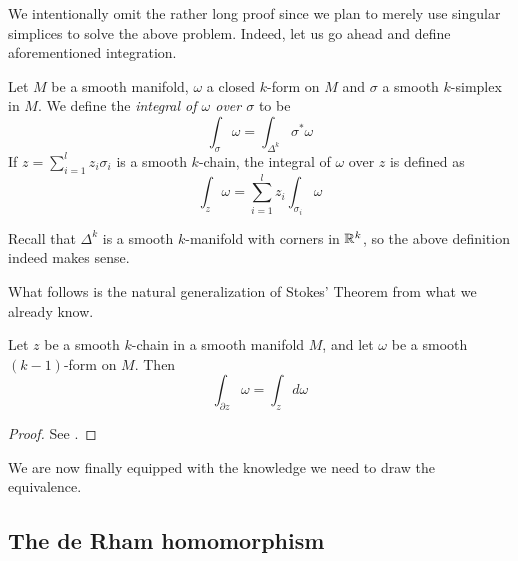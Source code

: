 \documentclass[a4paper, 12pt]{article}
\begin{document}
We intentionally omit the rather long proof since we plan to merely use singular simplices to solve the above problem.
Indeed, let us go ahead and define aforementioned integration.
\begin{definition}
    Let $M$ be a smooth manifold, $\omega$ a closed $k$-form on $M$ and $\sigma$ a smooth $k$-simplex in $M$.
    We define the \emph{integral of $\omega$ over $\sigma$} to be
    \[
        \int_{\sigma} \omega = \int_{\Delta^k} \sigma^*\omega
    \]
    If $z = \sum_{i = 1}^{l}z_i \sigma_i$ is a smooth $k$-chain, the integral of $\omega$ over $z$ is defined as
    \[
        \int_{z} \omega = \sum_{i = 1}^{l} z_i\int_{\sigma_i} \omega
    \]
\end{definition}
\begin{remark}
    Recall that $\Delta^k$ is a smooth $k$-manifold with corners in $\mathbb{R}^k$,
    so the above definition indeed makes sense.
\end{remark}
What follows is the natural generalization of Stokes' Theorem from what we already know.
\begin{theorem}
    Let $z$ be a smooth $k$-chain in a smooth manifold $M$, and let $\omega$ be a smooth $(k-1)$-form on $M$.
    Then
    \[
        \int_{\partial z} \omega = \int_{z} d\omega
    \]
\end{theorem}
\begin{proof}
    See \cite[Thm. 18.12]{Lee2012}.
\end{proof}

We are now finally equipped with the knowledge we need to draw the equivalence.

\subsection{The de Rham homomorphism}
\end{document}
